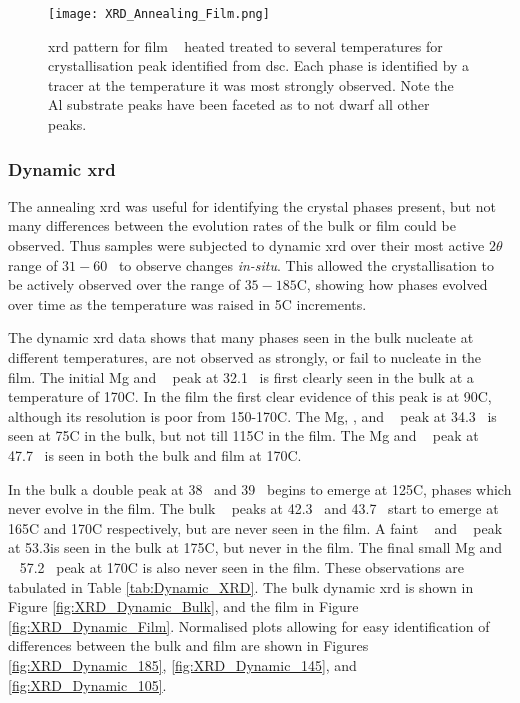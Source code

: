 \documentclass[a4paper,12pt,oneside]{article}%
\begin{document}
\begin{figure}[b]
	\centering
	\texttt{[image: XRD\_Annealing\_Film.png]}
	\caption[Table of contents Capition]{\acrshort{xrd} pattern for film \MgZnCa~ heated treated to several temperatures for crystallisation peak identified from \acrshort{dsc}. Each phase is identified by a tracer at the temperature it was most strongly observed. Note the Al substrate peaks have been faceted as to not dwarf all other peaks.}
	\label{fig:XRD_Annealing_Film}
\end{figure}

\subsubsection{Dynamic \acrshort{xrd}}

The annealing \acrshort{xrd} was useful for identifying the crystal phases present, but not many differences between the evolution rates of the bulk or film could be observed. Thus samples were subjected to dynamic \acrshort{xrd} over their most active $2 \theta$ range of $31-60$\degree~ to observe changes \textit{in-situ}. This allowed the crystallisation to be actively observed over the range of $35-185$\degree C, showing how phases evolved over time as the temperature was raised in 5\degree C increments. 

The dynamic \acrshort{xrd} data shows that many phases seen in the bulk nucleate at different temperatures, are not observed as strongly, or fail to nucleate in the film. The initial Mg and \MgZn~ peak at 32.1\degree~ is first clearly seen in the bulk at a temperature of 170\degree C. In the film the first clear evidence of this peak is at 90\degree C, although its resolution is poor from 150-170\degree C. The Mg, \MgZn, and \CaMgZnFive~ peak at 34.3\degree~ is seen at 75\degree C in the bulk, but not till 115\degree C in the film. The Mg and \MgZn~ peak at 47.7\degree~ is seen in both the bulk and film at 170\degree C. 

In the bulk a double peak at 38\degree~ and 39\degree~ begins to emerge at 125\degree C, phases which never evolve in the film. The bulk \CaMgZnFive~ peaks at 42.3\degree~ and 43.7\degree~ start to emerge at 165\degree C and 170\degree C respectively, but are never seen in the film. A faint \MgZn~ and \CaMgZnFive~ peak at 53.3\degree is seen in the bulk at 175\degree C, but never in the film. The final small Mg and \MgZn~ 57.2\degree~ peak at 170\degree C is also never seen in the film. These observations are tabulated in Table \ref{tab:Dynamic_XRD}. The bulk dynamic \acrshort{xrd} is shown in Figure \ref{fig:XRD_Dynamic_Bulk}, and the film in Figure \ref{fig:XRD_Dynamic_Film}. Normalised plots allowing for easy identification of differences between the bulk and film are shown in Figures \ref{fig:XRD_Dynamic_185}, \ref{fig:XRD_Dynamic_145}, and \ref{fig:XRD_Dynamic_105}.
\end{document}

